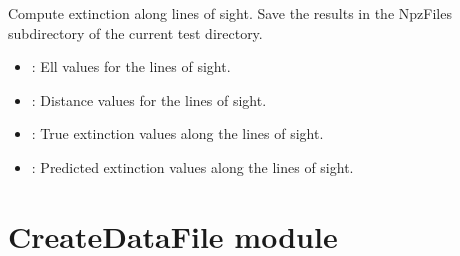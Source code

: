 \documentclass[letterpaper,10pt,english]{sphinxmanual}
\begin{document}
\begin{fulllineitems}
\begin{fulllineitems}
\end{fulllineitems}


\begin{fulllineitems}
\label{\detokenize{Calculator:Calculator.Calculator.compute_extinction_sight}}
\pysigstartsignatures
{}
\pysigstopsignatures
\sphinxAtStartPar
Compute extinction along lines of sight.
Save the results in the NpzFiles subdirectory of the current test directory.
\begin{description}
\begin{itemize}
\item {} 
\sphinxAtStartPar
{}: Ell values for the lines of sight.

\item {} 
\sphinxAtStartPar
{}: Distance values for the lines of sight.

\item {} 
\sphinxAtStartPar
{}: True extinction values along the lines of sight.

\item {} 
\sphinxAtStartPar
{}: Predicted extinction values along the lines of sight.

\end{itemize}

\end{description}

\end{fulllineitems}


\end{fulllineitems}


\sphinxstepscope


\section{CreateDataFile module}
\label{\detokenize{CreateDataFile:module-CreateDataFile}}\label{\detokenize{CreateDataFile:createdatafile-module}}\label{\detokenize{CreateDataFile::doc}}
\end{document}
